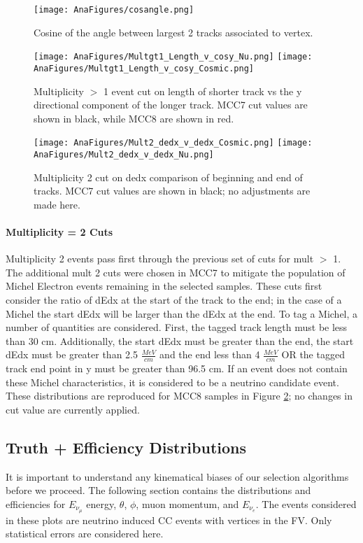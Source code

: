 \documentclass[12pt]{article}
\begin{document}
\begin{figure}[h!]
\centering
\texttt{[image: AnaFigures/cosangle.png]}
\caption{Cosine of the angle between largest 2 tracks associated to vertex. }
\label{fig:cosineangle}
\end{figure}

\begin{figure}[h!]
\centering
\texttt{[image: AnaFigures/Multgt1\_Length\_v\_cosy\_Nu.png]}
\hspace{1 mm}
\texttt{[image: AnaFigures/Multgt1\_Length\_v\_cosy\_Cosmic.png]}
\caption{Multiplicity $>$ 1 event cut on length of shorter track vs the y directional component of the longer track. MCC7 cut values are shown in black, while MCC8 are shown in red. }
\label{fig:mcc8_multgt2}
\texttt{[image: AnaFigures/Mult2\_dedx\_v\_dedx\_Cosmic.png]}
\hspace{1 mm}
\texttt{[image: AnaFigures/Mult2\_dedx\_v\_dedx\_Nu.png]}
\label{fig:mcc8_mult2}
\caption{Multiplicity 2 cut on dedx comparison of beginning and end of tracks.  MCC7 cut values are shown in black; no adjustments are made here. }
\end{figure}

\paragraph{Multiplicity = 2 Cuts}
Multiplicity 2 events pass first through the previous set of cuts for mult $>$ 1. The additional mult 2 cuts were chosen in MCC7 to mitigate the population of Michel Electron events remaining in the selected samples. These cuts first consider the ratio of dEdx at the start of the track to the end; in the case of a Michel the start dEdx will be larger than the dEdx at the end. To tag a Michel, a number of quantities are considered. First, the tagged track length must be less than 30 cm. Additionally, the start dEdx must be greater than the end, the start dEdx must be greater than 2.5 $\frac{MeV}{cm}$ and the end less than 4 $\frac{MeV}{cm}$ OR the tagged track end point in y must be greater than 96.5 cm. If an event does not contain these Michel characteristics, it is considered to be a neutrino candidate event.  These distributions are reproduced for MCC8 samples in Figure \ref{fig:mcc8_mult2}; no changes in cut value are currently applied.

\subsection{Truth + Efficiency Distributions}
It is important to understand any kinematical biases of our selection algorithms before we proceed. The following section contains the distributions and efficiencies for $E_{\nu_{\mu}}$ energy, $\theta$, $\phi$, muon momentum, and $E_{\nu_e}$. The events considered in these plots are neutrino induced CC events with vertices in the FV. Only statistical errors are considered here.
\end{document}
